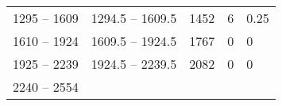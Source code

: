\documentclass[]{book}
\begin{document}
\begin{longtable}[]{@{}lllll@{}}
\begin{minipage}[t]{0.18\columnwidth}
1295 -- 1609\strut
\end{minipage} & \begin{minipage}[t]{0.23\columnwidth}\raggedright
1294.5 -- 1609.5\strut
\end{minipage} & \begin{minipage}[t]{0.13\columnwidth}\raggedright
1452\strut
\end{minipage} & \begin{minipage}[t]{0.14\columnwidth}\raggedright
6\strut
\end{minipage} & \begin{minipage}[t]{0.14\columnwidth}\raggedright
0.25\strut
\end{minipage}\tabularnewline
\begin{minipage}[t]{0.18\columnwidth}\raggedright
1610 -- 1924\strut
\end{minipage} & \begin{minipage}[t]{0.23\columnwidth}\raggedright
1609.5 -- 1924.5\strut
\end{minipage} & \begin{minipage}[t]{0.13\columnwidth}\raggedright
1767\strut
\end{minipage} & \begin{minipage}[t]{0.14\columnwidth}\raggedright
0\strut
\end{minipage} & \begin{minipage}[t]{0.14\columnwidth}\raggedright
0\strut
\end{minipage}\tabularnewline
\begin{minipage}[t]{0.18\columnwidth}\raggedright
1925 -- 2239\strut
\end{minipage} & \begin{minipage}[t]{0.23\columnwidth}\raggedright
1924.5 -- 2239.5\strut
\end{minipage} & \begin{minipage}[t]{0.13\columnwidth}\raggedright
2082\strut
\end{minipage} & \begin{minipage}[t]{0.14\columnwidth}\raggedright
0\strut
\end{minipage} & \begin{minipage}[t]{0.14\columnwidth}\raggedright
0\strut
\end{minipage}\tabularnewline
\begin{minipage}[t]{0.18\columnwidth}\raggedright
2240 -- 2554\strut
\end{minipage} & \begin{minipage}[t]{0.23\columnwidth}\raggedright

\end{minipage}
\end{longtable}
\end{document}
